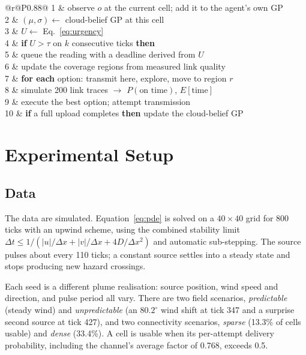 \documentclass[pdflatex,sn-mathphys-num,iicol]{sn-jnl}
\theoremstyle{thmstyleone}
\theoremstyle{thmstyletwo}
\theoremstyle{thmstylethree}
\begin{document}
\begin{algorithm}[t]
\caption{One mission tick. Lines 3--5 are the trigger; lines 7--9 are the routing.}\label{alg:loop}
\footnotesize
\begin{tabular}{@{}r@{\hspace{0.6em}}P{0.88\columnwidth}@{}}
1 & observe $o$ at the current cell; add it to the agent's own GP \\
2 & $(\mu, \sigma) \leftarrow$ cloud-belief GP at this cell \\
3 & $U \leftarrow$ Eq.~\eqref{eq:urgency} \\
4 & \textbf{if} $U > \tau$ on $k$ consecutive ticks \textbf{then} \\
5 & \quad queue the reading with a deadline derived from $U$ \\
6 & update the coverage regions from measured link quality \\
7 & \textbf{for each} option: transmit here, explore, move to region $r$ \\
8 & \quad simulate 200 link traces $\rightarrow$ $P(\text{on time})$, $E[\text{time}]$ \\
9 & execute the best option; attempt transmission \\
10 & \textbf{if} a full upload completes \textbf{then} update the cloud-belief GP \\
\end{tabular}
\end{algorithm}

\section{Experimental Setup}\label{sec:setup}

\subsection{Data}

The data are simulated. Equation~\eqref{eq:pde} is solved on a $40\times40$ grid for 800
ticks with an upwind scheme, using the combined stability limit
$\Delta t \leq 1/(|u|/\Delta x + |v|/\Delta x + 4D/\Delta x^2)$ and automatic
sub-stepping. The source pulses about every 110 ticks; a constant source settles into a
steady state and stops producing new hazard crossings.

Each seed is a different plume realisation: source position, wind speed and direction, and pulse
period all vary. There are two field scenarios, \emph{predictable} (steady wind) and
\emph{unpredictable} (an $80.2^\circ$ wind shift at tick 347 and a surprise second source
at tick 427), and two connectivity scenarios, \emph{sparse} (13.3\% of cells usable) and
\emph{dense} (33.4\%). A cell is usable when its per-attempt delivery probability,
including the channel's average factor of 0.768, exceeds 0.5.
\end{document}
